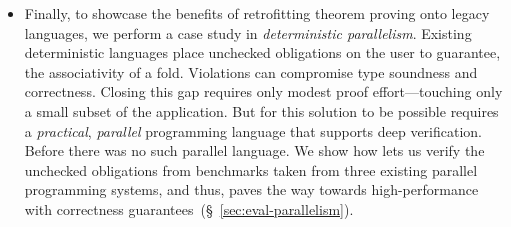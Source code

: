 \begin{itemize}
\item %
Finally, to showcase the benefits of retrofitting
theorem proving onto legacy languages, we perform
a case study in \emph{deterministic parallelism}.
%
%
Existing deterministic languages place unchecked
obligations on the user to guarantee, \eg the
associativity of a fold.
%
Violations can compromise type soundness
and correctness.
%
Closing this gap requires only modest proof
effort---touching only a small subset of
the application.
%
But for this solution to be possible requires a
\emph{practical}, \emph{parallel} programming
language that supports deep verification.
%
Before \toolname there was no such parallel language.
%
%
We show how \toolname lets us verify the unchecked obligations
from benchmarks taken from three existing parallel programming 
systems, and thus, paves the way towards 
high-performance with correctness guarantees~(\S~\ref{sec:eval-parallelism}).
\end{itemize}
